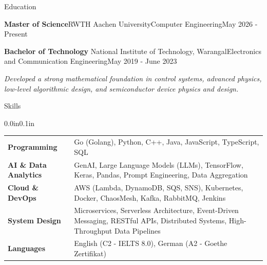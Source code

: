 \documentclass{resume} %
\makeatletter
\newcommand{\italicitem}[1]{\item{\textit{#1}}}
\newcommand{\entry}[2]{#1 & #2 \tabularnewline} %
\newcommand{\tableEnv}[2]{%
  \begin{rSection}{#1} 
    \begin{adjustwidth}{0.0in}{0.1in} 
      \begin{tabularx}{\linewidth}{@{} >{\bfseries}l @{\hspace{6ex}} X @{}}
        #2 
      \end{tabularx}
    \end{adjustwidth}
  \end{rSection}
}
\makeatother
\begin{document}
\begin{rSection}{Education}

    \begin{rSubsectionNoBullet}{\bf Master of Science}{RWTH Aachen University}{Computer Engineering}{May 2026 - Present}
        \italicitem{}
    \end{rSubsectionNoBullet}
    
    \begin{rSubsectionNoBullet}{\bf Bachelor of Technology }{National Institute of Technology, Warangal}{Electronics and Communication Engineering}{May 2019 - June 2023}
        \italicitem{Developed a strong mathematical foundation in control systems, advanced physics, low-level algorithmic design, and semiconductor device physics and design.}
    \end{rSubsectionNoBullet}

\end{rSection}


\tableEnv{Skills}{
    \entry{Programming}{Go (Golang), Python, C++, Java, JavaScript, TypeScript, SQL}
    
    \entry{AI \& Data Analytics}{GenAI, Large Language Models (LLMs), TensorFlow, Keras, Pandas, Prompt Engineering, Data Aggregation}
    
    \entry{Cloud \& DevOps}{AWS (Lambda, DynamoDB, SQS, SNS), Kubernetes, Docker, ChaosMesh, Kafka, RabbitMQ, Jenkins}
    
    \entry{System Design}{Microservices, Serverless Architecture, Event-Driven Messaging, RESTful APIs, Distributed Systems, High-Throughput Data Pipelines}

    \entry{Languages}{English (C2 - IELTS 8.0), German (A2 - Goethe Zertifikat)}
}

\end{document}

